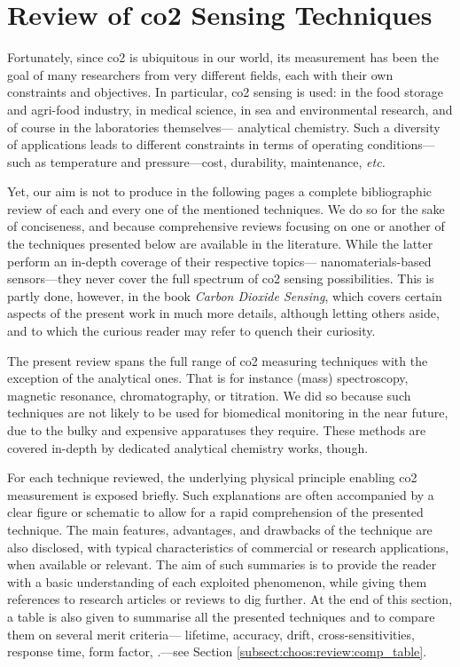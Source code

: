 \section{Review of \texorpdfstring{\gls{co2}}{CO2} Sensing Techniques}\label{sect:choos:sensors_review}

Fortunately, since \gls{co2} is ubiquitous in our world, its measurement has been the goal of many researchers from very different fields, each with their own constraints and objectives. In particular, \gls{co2} sensing is used: in the food storage and agri-food industry\cite{acock1995}, in medical science\cite{severinghaus1986_3}, in sea and environmental research\cite{shitashima2010}, and of course in the laboratories themselves---\eg{} analytical chemistry. Such a diversity of applications leads to different constraints in terms of operating conditions---such as temperature and pressure---cost, durability, maintenance, \textit{etc.}

Yet, our aim is not to produce in the following pages a complete bibliographic review of each and every one of the mentioned techniques. We do so for the sake of conciseness, and because comprehensive reviews focusing on one or another of the techniques presented below are available in the literature\cite{fanget2011, zosel2011, puligundla2012, llobet2013, neethirajan2009, barrington2018, rebber2020, rezk2020, bhowmick2020}. While the latter perform an in-depth coverage of their respective topics---\eg{} nanomaterials-based sensors\cite{llobet2013, rezk2020}---they never cover the full spectrum of \gls{co2} sensing possibilities. This is partly done, however, in the book \emph{Carbon Dioxide Sensing}\cite{decker2019}, which covers certain aspects of the present work in much more details, although letting others aside, and to which the curious reader may refer to quench their curiosity.

The present review spans the full range of \gls{co2} measuring techniques with the exception of the analytical ones. That is for instance (mass) spectroscopy, magnetic resonance, chromatography, or titration. We did so because such techniques are not likely to be used for biomedical monitoring in the near future, due to the bulky and expensive apparatuses they require. These methods are covered in-depth by dedicated analytical chemistry works, though\cite{skoog2013, harvey2016}.

For each technique reviewed, the underlying physical principle enabling \gls{co2} measurement is exposed briefly. Such explanations are often accompanied by a clear figure or schematic to allow for a rapid comprehension of the presented technique. The main features, advantages, and drawbacks of the technique are also disclosed, with typical characteristics of commercial or research applications, when available or relevant. The aim of such summaries is to provide the reader with a basic understanding of each exploited phenomenon, while giving them references to research articles or reviews to dig further. At the end of this section, a table is also given to summarise all the presented techniques and to compare them on several merit criteria---\eg{} lifetime, accuracy, drift, cross-sensitivities, response time, form factor, \etc{}.---see Section \ref{subsect:choos:review:comp_table}.

